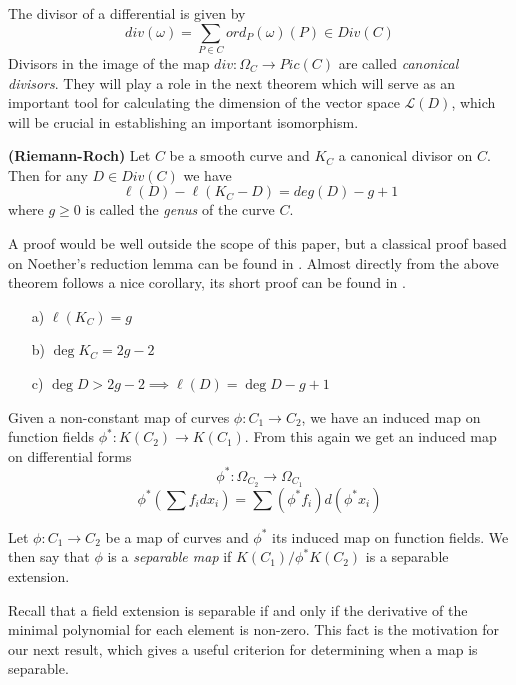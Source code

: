 The divisor of a differential is given by
$$ div(\omega) = \sum_{P\in C} ord_P(\omega)(P) \in Div(C)$$
Divisors in the image of the map $div: \Omega_C \rightarrow Pic(C)$ are called
\emph{canonical divisors}. They will play a role in the next theorem which will
serve as an important tool for calculating the dimension of the vector space
$\mathscr{L}(D)$, which will be crucial in establishing an important isomorphism.

\begin{thm}
 \textbf{(Riemann-Roch)}
  Let $C$ be a smooth curve and $K_C$ a canonical divisor on $C$. Then for
any $D \in Div(C)$ we have
$$ \ell(D) - \ell(K_C - D) = deg(D) - g + 1 $$
where $g \geq 0$ is called the \emph{genus} of the curve $C$.
\end{thm}

 A proof would be well outside the scope of this paper, but a classical proof based
on Noether's reduction lemma can be found in \cite{Fulton}. Almost directly from the
above theorem follows a nice corollary, its short proof can be found in \cite{AEC}.

\begin{cor} \label{rrcor}
 \begin{enumerate}
Let $K_C$ be a canonical divisor, then
  \item[a)] $\ell(K_C) = g$
  \item[b)] $\deg K_C = 2g - 2$
  \item[c)] $\deg D > 2g - 2 \implies \ell(D) = \deg D - g + 1$ 
 \end{enumerate}
\end{cor}

Given a non-constant map of curves $\phi: C_1 \rightarrow C_2$, we have an induced map
on function fields $\phi^*: K(C_2) \rightarrow K(C_1)$. From this again we get an induced
map on differential forms
$$ \phi^*: \Omega_{C_2} \rightarrow \Omega_{C_1} $$
$$ \phi^*\left(\sum f_i dx_i\right) = \sum (\phi^* f_i) d(\phi^* x_i) $$
\label{diff}

\begin{mydef} 
 Let $\phi: C_1 \rightarrow C_2$ be a map of curves and $\phi^*$ its induced map on
function fields. We then say that $\phi$ is a \emph{separable map} if
$K(C_1)/\phi^* K(C_2)$ is a separable extension.
\end{mydef}

Recall that a field extension is separable if and only if the derivative of the minimal
polynomial for each element is non-zero. This fact is the motivation for our next result,
which gives a useful criterion for determining when a map is separable.

